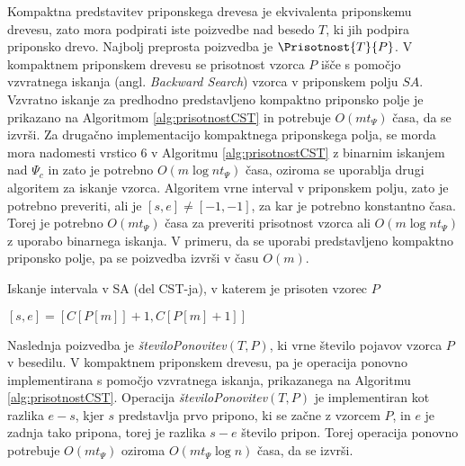 Kompaktna predstavitev priponskega drevesa je ekvivalenta priponskemu drevesu, zato mora podpirati iste poizvedbe nad besedo $T$, ki jih podpira priponsko drevo. Najbolj preprosta poizvedba je $\Prisotnost{T}{P}$. V kompaktnem priponskem drevesu se prisotnost vzorca $P$ išče s pomočjo vzvratnega iskanja (angl. \textit{Backward Search}) vzorca v priponskem polju $SA$. Vzvratno iskanje za predhodno predstavljeno kompaktno priponsko polje je prikazano na Algoritmom \ref{alg:prisotnostCST} in potrebuje $O(mt_\Psi)$ časa, da se izvrši. Za drugačno implementacijo kompaktnega priponskega polja, se morda mora nadomesti vrstico 6 v Algoritmu \ref{alg:prisotnostCST} z binarnim iskanjem nad $\Psi_c$ in zato je potrebno $O(m\log{n}t_\Psi)$ časa, oziroma se uporablja drugi algoritem za iskanje vzorca. Algoritem vrne interval v priponskem polju, zato je potrebno preveriti, ali je $[s,e]\ne[-1,-1]$, za kar je potrebno konstantno časa. Torej je potrebno $O(mt_\Psi)$ časa za preveriti prisotnost vzorca ali $O(m\log{n}t_\Psi)$ z uporabo binarnega iskanja. V primeru, da se uporabi predstavljeno kompaktno priponsko polje, pa se poizvedba izvrši v času $O(m)$. 

\begin{algorithm}[tb]

\caption{Iskanje intervala v SA (del CST-ja), v katerem je prisoten vzorec $P$ \cite{Navarro2016}}\label{alg:prisotnostCST}    
{
    {$[s,e]=[C[P[m]]+1,C[P[m]+1]]$}
    

    {\KwRet{$[s,e]$}}
}

\end{algorithm}




Naslednja poizvedba je \textit{številoPonovitev}$(T,P)$, ki vrne število pojavov vzorca $P$ v besedilu. V kompaktnem priponskem drevesu, pa je operacija ponovno implementirana s pomočjo vzvratnega iskanja, prikazanega na Algoritmu \ref{alg:prisotnostCST}. Operacija \textit{številoPonovitev}$(T,P)$ je implementiran kot razlika $e-s$, kjer $s$ predstavlja prvo pripono, ki se začne z vzorcem $P$, in $e$ je zadnja tako pripona, torej je razlika $s-e$ število pripon. Torej operacija ponovno potrebuje $O(mt_\Psi)$ oziroma $O(mt_\Psi\log{n})$ časa, da se izvrši.

